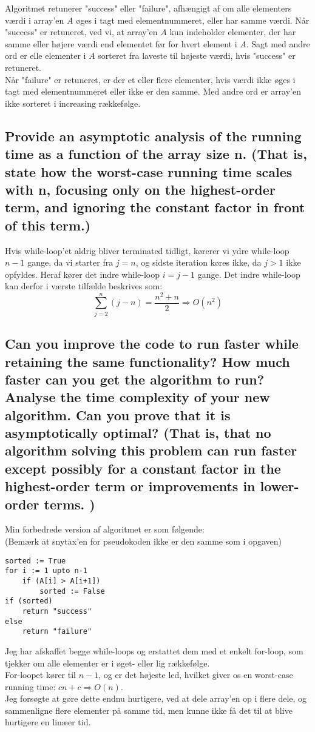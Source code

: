 \documentclass[a4paper,12pt]{article}
\begin{document}
Algoritmet retunerer "success" eller "failure", afhængigt af om alle elementers værdi i array'en $A$ øges i tagt med elementnummeret, eller har samme værdi.
Når "success" er retuneret, ved vi, at array'en $A$ kun indeholder elementer, der har samme eller højere værdi end elementet før for hvert element i $A$. Sagt med andre ord er elle elementer i $A$ sorteret fra laveste til højeste værdi, hvis "success" er retuneret.\\
Når "failure" er retuneret, er der et eller flere elementer, hvis værdi ikke øges i tagt med elementnummeret eller ikke er den samme. Med andre ord er array'en ikke sorteret i increasing rækkefølge.
    
\subsection[]{Provide an asymptotic analysis of the running time as a function of the array size n. (That
is, state how the worst-case running time scales with n, focusing only on the highest-order
term, and ignoring the constant factor in front of this term.)}

Hvis while-loop'et aldrig bliver terminated tidligt, kørerer vi ydre while-loop $n-1$ gange, da vi starter fra $j = n$, og sidste iteration køres ikke, da $j > 1$ ikke opfyldes. Heraf kører det indre while-loop $i=j-1$ gange. Det indre while-loop kan derfor i værste tilfælde beskrives som:
\[\sum_{j=2}^{n}(j-n)=\dfrac{n^2+n}{2}\Rightarrow O(n^2)\]

\subsection[]{Can you improve the code to run faster while retaining the same functionality? How
much faster can you get the algorithm to run? Analyse the time complexity of your new
algorithm. Can you prove that it is asymptotically optimal? (That is, that no algorithm
solving this problem can run faster except possibly for a constant factor in the highest-order
term or improvements in lower-order terms. )}

Min forbedrede version af algoritmet er som følgende:\\
(Bemærk at snytax'en for pseudokoden ikke er den samme som i opgaven)
\begin{lstlisting}
sorted := True          
for i := 1 upto n-1     
    if (A[i] > A[i+1])  
        sorted := False 
if (sorted)             
    return "success"    
else                    
    return "failure"  
\end{lstlisting}
Jeg har afskaffet begge while-loops og erstattet dem med et enkelt for-loop, som tjekker om alle elementer er i øget- eller lig rækkefølge.\\
For-loopet kører til $n-1$, og er det højeste led, hvilket giver os en worst-case running time: $cn + c \Rightarrow O(n)$.\\
Jeg forsøgte at gøre dette endnu hurtigere, ved at dele array'en op i flere dele, og sammenligne flere elementer på samme tid, men kunne ikke få det til at blive hurtigere en linæer tid.
\end{document}
